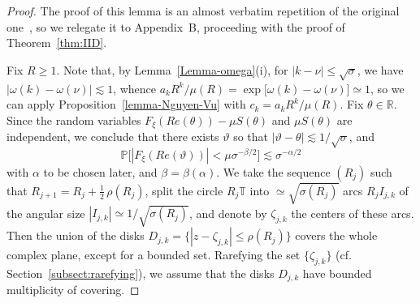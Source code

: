 \documentclass[11pt]{amsart}
\numberwithin{equation}{section}
\newcommand{\bR}{\mathbb R}
\newcommand{\bT}{\mathbb T}
\newcommand{\bP}{\mathbb P}
\begin{document}
\begin{proof}
The proof of this lemma is an almost verbatim repetition of the original one~\cite[Lemma~9.2]{NV},
so we relegate it to Appendix~B, proceeding with the proof of Theorem~\ref{thm:IID}.

\medskip
Fix $R\ge 1$. Note that, by Lemma~\ref{Lemma-omega}(i),
for $|k-\nu|\le \sqrt{\sigma}$, we have
$|\omega (k)-\omega(\nu)| \lesssim 1$, whence
$a_kR^k/\mu (R) = \exp\bigl[ \omega(k) - \omega (\nu) \bigr] \simeq 1$,
so we can apply Proposition~\ref{lemma-Nguyen-Vu} with $c_k = a_kR^k/\mu (R)$.
Fix $\theta\in\bR$.
Since the random variables
$F_\xi (Re(\theta))- \mu S(\theta)$ and $\mu S(\theta)$ are independent, we conclude
that there exists $\vartheta$ so that
$|\vartheta-\theta|\lesssim 1/\sqrt{\sigma}$, and
\[
\bP \bigl[
|F_\xi(Re(\vartheta))| < \mu \sigma^{-\beta/2}
\bigr] \lesssim \sigma^{-\alpha/2}
\]
with $\alpha$ to be chosen later, and $\beta=\beta(\alpha)$.
We take the sequence $(R_j)$ such that $R_{j+1}=R_j + \tfrac12\, \rho(R_j)$,
split the circle $R_j\bT$ into $\simeq \sqrt{\sigma(R_j)}$ arcs $R_j I_{j, k}$ of the angular
size $|I_{j, k}|\simeq 1/\sqrt{\sigma(R_j)}$, and denote by $\zeta_{j, k}$ the centers of
these arcs. Then the union of the disks $D_{j, k} = \{|z-\zeta_{j, k}|\le\rho(R_j)\}$ covers
the whole complex plane, except for a bounded set.
Rarefying the set $\{\zeta_{j, k}\}$ (cf. Section~\ref{subsect:rarefying}), we assume that the
disks $D_{j, k}$ have bounded multiplicity of covering.


\end{proof}
\end{document}
